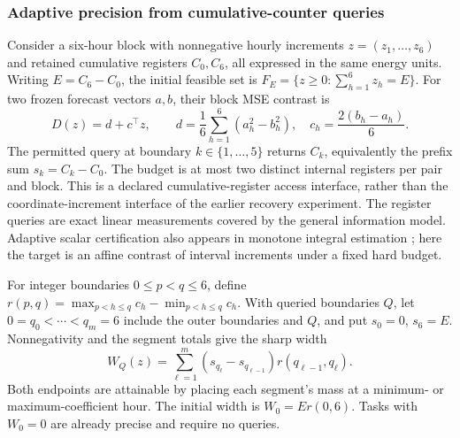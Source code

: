 \documentclass[12pt]{article}
\begin{document}
\subsubsection{Adaptive precision from cumulative-counter queries}
\label{sec:counter-precision-method}
Consider a six-hour block with nonnegative hourly increments
$z=(z_1,\ldots,z_6)$ and retained cumulative registers $C_0,C_6$,
all expressed in the same energy units.
Writing $E=C_6-C_0$, the initial feasible set is
$F_E=\{z\geq0:\sum_{h=1}^6z_h=E\}$.
For two frozen forecast vectors $a,b$, their block MSE contrast is
\[
 D(z)=d+c^\top z,\qquad
 d=\frac16\sum_{h=1}^6(a_h^2-b_h^2),\quad
 c_h=\frac{2(b_h-a_h)}6.
\]
The permitted query at boundary $k\in\{1,\ldots,5\}$ returns
$C_k$, equivalently the prefix sum $s_k=C_k-C_0$.
The budget is at most two distinct internal registers per pair and block.
This is a declared cumulative-register access interface, rather than the
coordinate-increment interface of the earlier recovery experiment.
The register queries are exact linear measurements covered by the general
information model. Adaptive scalar certification also appears in monotone
integral estimation \citep[Section~4.1]{gaillard2023}; here the target is an
affine contrast of interval increments under a fixed hard budget.

For integer boundaries $0\leq p<q\leq6$, define
$r(p,q)=\max_{p<h\leq q}c_h-\min_{p<h\leq q}c_h$.
With queried boundaries $Q$, let $0=q_0<\cdots<q_m=6$ include
the outer boundaries and $Q$, and put $s_0=0$, $s_6=E$.
Nonnegativity and the segment totals give the sharp width
\begin{equation}
 W_Q(z)=\sum_{\ell=1}^{m}
 (s_{q_\ell}-s_{q_{\ell-1}})r(q_{\ell-1},q_\ell).
 \label{eq:counter-width}
\end{equation}
Both endpoints are attainable by placing each segment's mass at a
minimum- or maximum-coefficient hour. The initial width is $W_0=Er(0,6)$.
Tasks with $W_0=0$ are already precise and require no queries.
\end{document}
